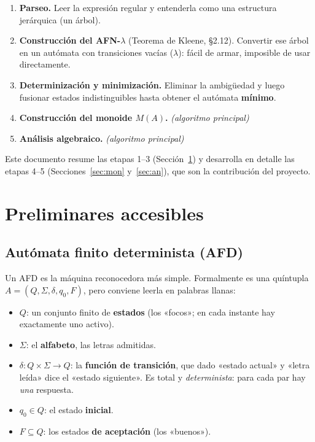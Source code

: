 \documentclass[11pt,a4paper]{article}
\theoremstyle{acc}
\begin{document}
\begin{enumerate}
  \item \textbf{Parseo.} Leer la expresión regular y entenderla como una
        estructura jerárquica (un árbol).
  \item \textbf{Construcción del AFN-$\lambda$} (Teorema de Kleene, §2.12).
        Convertir ese árbol en un autómata con transiciones vacías
        ($\lambda$): fácil de armar, imposible de usar directamente.
  \item \textbf{Determinización y minimización.} Eliminar la ambigüedad y luego
        fusionar estados indistinguibles hasta obtener el autómata
        \textbf{mínimo}.
  \item \textbf{Construcción del monoide $M(A)$.} \emph{(algoritmo principal)}
  \item \textbf{Análisis algebraico.} \emph{(algoritmo principal)}
\end{enumerate}

Este documento resume las etapas 1--3 (Sección~\ref{sec:auto}) y desarrolla en
detalle las etapas 4--5 (Secciones~\ref{sec:mon} y~\ref{sec:an}), que son la
contribución del proyecto.

\section{Preliminares accesibles}\label{sec:auto}

\subsection{Autómata finito determinista (AFD)}
Un AFD es la máquina reconocedora más simple. Formalmente es una quíntupla
$A=(Q,\Sigma,\delta,q_0,F)$, pero conviene leerla en palabras llanas:

\begin{itemize}
  \item $Q$: un conjunto finito de \textbf{estados} (los «focos»; en cada
        instante hay exactamente uno activo).
  \item $\Sigma$: el \textbf{alfabeto}, las letras admitidas.
  \item $\delta:Q\times\Sigma\to Q$: la \textbf{función de transición}, que dado
        «estado actual» y «letra leída» dice el «estado siguiente». Es total y
        \emph{determinista}: para cada par hay \emph{una} respuesta.
  \item $q_0\in Q$: el estado \textbf{inicial}.
  \item $F\subseteq Q$: los estados \textbf{de aceptación} (los «buenos»).
\end{itemize}
\end{document}
